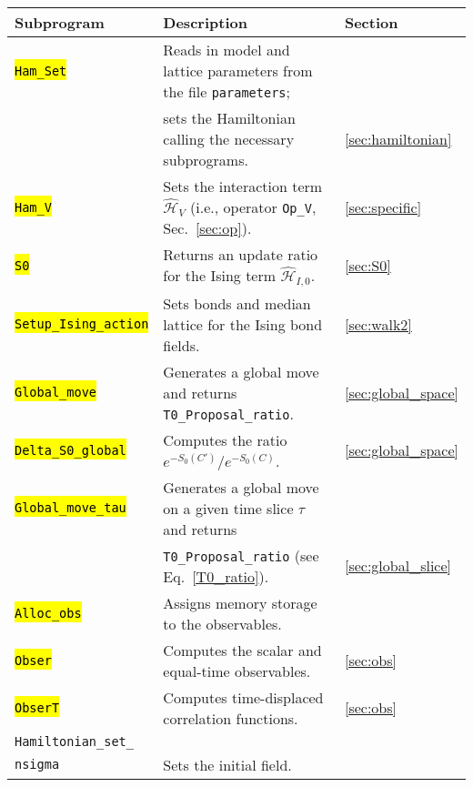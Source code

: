 %
\begin{table}[h]
	\begin{center}
    \begin{tabular}{@{} l l l @{}}\toprule
    Subprogram & Description & Section \\\midrule
    \hl{\texttt{Ham\_Set}}  & Reads in model and lattice parameters from the file \texttt{parameters}; \\
                       & sets the Hamiltonian calling the necessary subprograms. & \ref{sec:hamiltonian}\\
    \hl{\texttt{Ham\_V}}    & Sets the interaction term $\hat{\mathcal{H}}_{V}$ (i.e., operator \texttt{Op\_V}, Sec.~\ref{sec:op}). & \ref{sec:specific}\\
    \hl{\texttt{S0}}        & Returns an update ratio for the Ising term $\hat{\mathcal{H}}_{I,0}$. 
    & \ref{sec:S0} \\
    \hl{\texttt{Setup\_Ising\_action}}    & Sets bonds and median lattice for the Ising bond fields. & \ref{sec:walk2}\\
    \hl{\texttt{Global\_move}} & Generates a global move and returns \texttt{T0\_Proposal\_ratio}. 
    & \ref{sec:global_space} \\
    \hl{\texttt{Delta\_S0\_global}} & Computes the ratio $e^{-S_0(C')}/e^{-S_0(C)}$. 
    & \ref{sec:global_space} \\
    \hl{\texttt{Global\_move\_tau}} & Generates a global move on a given time slice $\tau$ and returns\\ & \texttt{T0\_Proposal\_ratio} (see Eq.~\eqref{T0_ratio}). 
    & \ref{sec:global_slice} \\
    \hl{\texttt{Alloc\_obs}} & Assigns memory storage to the observables. & \\
    \hl{\texttt{Obser}}      & Computes the scalar and equal-time observables. & \ref{sec:obs} \\
    \hl{\texttt{ObserT}}     & Computes time-displaced correlation functions. & \ref{sec:obs}\\
    \texttt{Hamiltonian\_set\_} & & \\
    \texttt{nsigma}  & Sets the initial field. & \\

\end{tabular}
\end{center}
\end{table}
